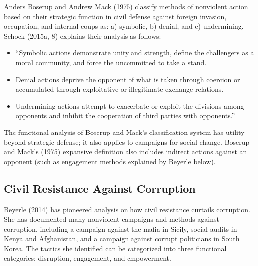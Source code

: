 \documentclass[twoside,a4paper,12pt,fleqn,openany]{extbook}
\begin{document}
Anders Boserup and Andrew Mack (1975) classify methods of nonviolent action based on their strategic function in civil defense against foreign invasion, occupation, and internal coups as: a) symbolic, b) denial, and c) undermining. Schock (2015a, 8) explains their analysis as follows:

\begin{itemize}
\item “Symbolic actions demonstrate unity and strength, define the challengers as a moral
community, and force the uncommitted to take a stand.
\item Denial actions deprive the opponent of what is taken through coercion or accumulated
through exploitative or illegitimate exchange relations.
\item Undermining actions attempt to exacerbate or exploit the divisions among opponents
and inhibit the cooperation of third parties with opponents.”
\end{itemize}

The functional analysis of Boserup and Mack’s classification system has utility beyond strategic defense; it also applies to campaigns for social change. Boserup and Mack’s (1975) expansive definition also includes indirect actions against an opponent (such as engagement methods explained by Beyerle below).

\subsection*{Civil Resistance Against Corruption}

Beyerle (2014) has pioneered analysis on how civil resistance curtails corruption. She has documented many nonviolent campaigns and methods against corruption, including a campaign against the mafia in Sicily, social audits in Kenya and Afghanistan, and a campaign against corrupt politicians in South Korea. The tactics she identified can be categorized into three functional categories: disruption, engagement, and empowerment.
\end{document}
